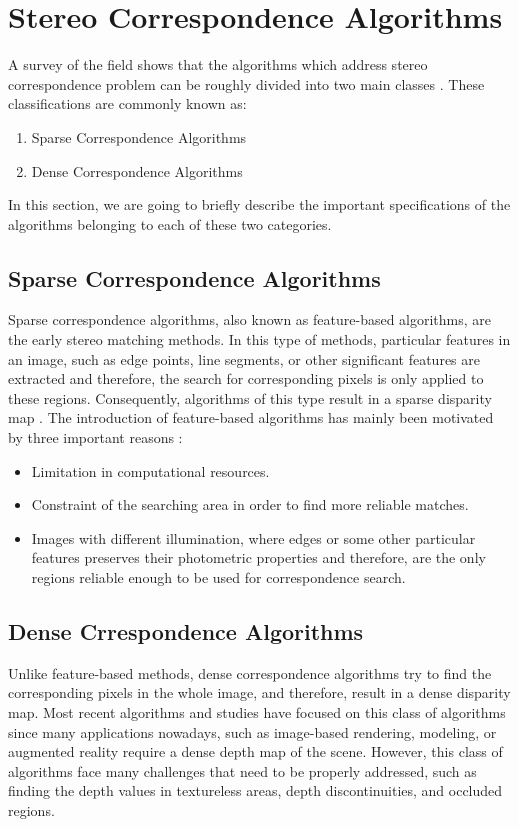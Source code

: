 \documentclass[dvips,letterpaper,12pt]{report}
\begin{document}
\section{Stereo Correspondence Algorithms}
A survey of the field shows that the algorithms which address stereo correspondence problem can be roughly divided into two main classes \cite{sch02}. These classifications are commonly known as:
\begin{enumerate}
\item Sparse Correspondence Algorithms
\item Dense Correspondence Algorithms 
\end{enumerate}

In this section, we are going to briefly describe the important specifications of the algorithms belonging to each of these two categories.
\subsection{Sparse Correspondence Algorithms}
Sparse correspondence algorithms, also known as feature-based algorithms, are the early stereo matching methods. In this type of methods, particular features in an image, such as edge 
points, line segments, or other significant features are extracted and therefore, the search for corresponding pixels is only applied to these regions. Consequently, algorithms of this
type result in a sparse disparity map \cite{matt89,hsie92, sze11}. The introduction of feature-based algorithms has mainly been motivated by three important reasons \cite{sze11}:
\begin{itemize}
\item Limitation in computational resources.
\item Constraint of the searching area in order to find more reliable matches.
\item Images with different illumination, where edges or some other particular features preserves their photometric properties and therefore, are the only regions reliable enough to 
be used for correspondence search.
\end{itemize}

\subsection{Dense Crrespondence Algorithms}
Unlike feature-based methods, dense correspondence algorithms try to find the
corresponding pixels in the whole image, and therefore, result in a dense disparity map. Most recent algorithms and studies have focused on this class of algorithms since many applications 
nowadays, such as image-based rendering, modeling, or augmented reality require a dense depth map of the scene. However, this class of algorithms face many challenges that need to be properly
addressed, such as finding the depth values in textureless areas, depth discontinuities, and occluded regions.
\end{document}
